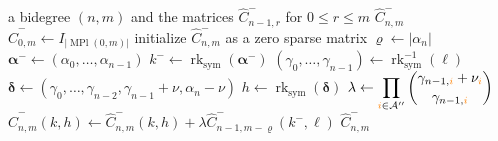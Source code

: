 \documentclass{amsart}
\theoremstyle{definition}
\theoremstyle{remark}
\newcommand{\orange}[1]{{\color{orange}#1}}
\begin{document}
\begin{algorithm}[ht]
\caption{Sparse matrix for $\widehat{\Psi}^{-1}$}
\label{alg:psi_hat_inverse}
\begin{algorithmic}[1]
\Require a bidegree $(n,m)$ and the matrices
$\widehat{C}^{-}_{n-1,r}$ for $0\leq r\leq m$
\Ensure $\widehat{C}^{-}_{n,m}$
    \State
    $\widehat{C}^{-}_{0,m}
    \gets
    I_{|\operatorname{MPl}(0,m)|}$
\Else
    \State initialize $\widehat{C}^{-}_{n,m}$ as a zero sparse matrix
        \State $\varrho\gets|\alpha_n|$
        \State
        $\boldsymbol{\alpha}^{-}
        \gets
        (\alpha_0,\ldots,\alpha_{n-1})$
        \State
        $k^{-}
        \gets
        \operatorname{rk}_{\mathrm{sym}}
        (\boldsymbol{\alpha}^{-})$
            \State
            $(\gamma_0,\ldots,\gamma_{n-1})
            \gets
            \operatorname{rk}_{\mathrm{sym}}^{-1}(\ell)$
                \State
                $\boldsymbol{\delta}
                \gets
                \left(
                    \gamma_0,\ldots,\gamma_{n-2},
                    \gamma_{n-1}+\nu,
                    \alpha_n-\nu
                \right)$
                \State
                $h
                \gets
                \operatorname{rk}_{\mathrm{sym}}
                (\boldsymbol{\delta})$
                \State
                $\displaystyle
                \lambda
                \gets
                \prod_{\orange{i}\in\mathcal{A}^{\prime\prime}}
                \binom{
                    \gamma_{n-1,\orange{i}}
                    +
                    \nu_{\orange{i}}
                }{
                    \gamma_{n-1,\orange{i}}
                }$
                \State
                $\widehat{C}^{-}_{n,m}(k,h)
                \gets
                \widehat{C}^{-}_{n,m}(k,h)
                +
                \lambda
                \widehat{C}^{-}_{n-1,m-\varrho}
                (k^{-},\ell)$
            \EndFor
        \EndFor
    \EndFor
\EndIf
\State \Return $\widehat{C}^{-}_{n,m}$
\end{algorithmic}
\end{algorithm}
\end{document}
